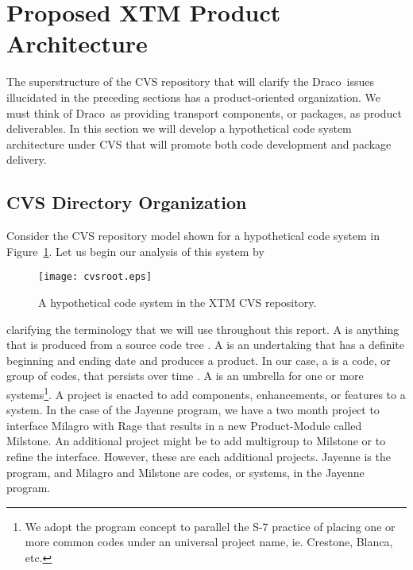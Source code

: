 \documentclass[11pt]{../tex/rnote}
\newcommand{\draco}{\textsf{Draco}}
\newcommand{\pkg}[1]{\textsf{#1}}
\begin{document}

\section{Proposed XTM Product Architecture}
\label{sec:architecture}

The superstructure of the CVS repository that will clarify the \draco\ 
issues illucidated in the preceding sections has a product-oriented
organization.  We must think of \draco\ as providing transport
components, or packages, as product deliverables.  In this section we
will develop a hypothetical code system architecture under CVS that will
promote both code development and package delivery.  

\subsection{CVS Directory Organization}

Consider the CVS repository model shown for a hypothetical code system
in Figure~\ref{fig:cvsroot}.  Let us begin our analysis of this system
by
\begin{figure}
  \centerline{\texttt{[image: cvsroot.eps]}}
  \caption{A hypothetical code system in the XTM CVS repository.}
  \label{fig:cvsroot}
\end{figure}
clarifying the terminology that we will use throughout this report. A
\latin{product} is anything that is produced from a source code tree
\cite{ja94}.  A \latin{project} is an undertaking that has a definite
beginning and ending date and produces a product.  In our case, a
\latin{system} is a code, or group of codes, that persists over time
\cite{tn98}.  A \latin{program} is an umbrella for one or more
systems\footnote{We adopt the program concept to parallel the S-7
  practice of placing one or more common codes under an universal
  project name, ie.  Crestone, Blanca, etc.}.  A project is enacted to
add components, enhancements, or features to a system.  In the case of
the \pkg{Jayenne} program, we have a two month project to interface
\pkg{Milagro} with \pkg{Rage} that results in a new
\pkg{Product-Module} called \pkg{Milstone}.  An additional project
might be to add multigroup to \pkg{Milstone} or to refine the
interface.  However, these are each additional projects.
\pkg{Jayenne} is the program, and \pkg{Milagro} and \pkg{Milstone} are
codes, or systems, in the \pkg{Jayenne} program.
\end{document}
